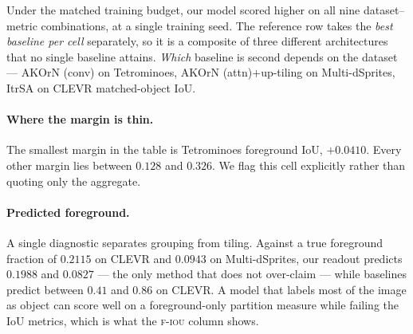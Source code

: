 \begin{table}[!t]
\caption{%
All models trained on the same $10{,}000$ CLEVR images for $10$ epochs and evaluated on $320$
held-out images per dataset by the same function. Tetrominoes and Multi-dSprites are zero-shot.
\textsc{ari}\,/\,\textsc{f-iou}\,/\,\textsc{o-iou} are foreground ARI, foreground IoU and
matched-object IoU on the $64\times64$ patch grid. Every model, ours included, has the
minimum-region-size rule of Section~\ref{sec:minsize} applied at the single value $f=0.01$ fixed
on CLEVR validation. It leaves the baseline rows unchanged to three decimals except AKOrN (conv)
on CLEVR foreground IoU, which improves from $.4219$ to $.4267$; the penultimate row uses the
better of the two for every baseline cell we measured. That row takes the best baseline \emph{in
each cell separately}, which no single baseline attains; our margin is measured against that
composite. Single training seed throughout. All models train on CLEVR only, but the conditions
are not symmetric: the baselines' cluster count and background mapping are selected on each
target dataset's own validation split, while our one free scalar is fixed on CLEVR validation and
transferred unchanged (Appendix~E).}
\label{tab:main}
\end{table}

Under the matched training budget, our model scored higher on all nine dataset--metric
combinations, at a single training seed. The reference row takes the \emph{best baseline per cell}
separately, so it is a composite of three different architectures that no single baseline attains.
\emph{Which} baseline is second depends on the dataset --- AKOrN (conv) on Tetrominoes, AKOrN
(attn)$+$up-tiling on Multi-dSprites, ItrSA on CLEVR matched-object IoU.

\paragraph{Where the margin is thin.}
The smallest margin in the table is Tetrominoes foreground IoU, $+0.0410$. Every other margin lies
between $0.128$ and $0.326$. We flag this cell explicitly rather than quoting only the aggregate.

\paragraph{Predicted foreground.}
A single diagnostic separates grouping from tiling. Against a true foreground fraction of
$0.2115$ on CLEVR and $0.0943$ on Multi-dSprites, our readout predicts $0.1988$ and $0.0827$ ---
the only method that does not over-claim --- while baselines predict between $0.41$ and $0.86$ on
CLEVR. A model that labels most of the image as object can score well on a foreground-only
partition measure while failing the IoU metrics, which is what the \textsc{f-iou} column shows.

